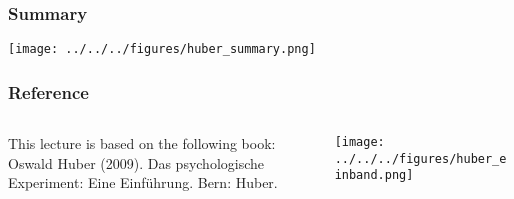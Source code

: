 \documentclass[]{beamer}
\begin{document}
\begin{frame}
\frametitle{Summary}
\texttt{[image: ../../../figures/huber\_summary.png]}
\end{frame}

\begin{frame}
 \frametitle{Reference}
\begin{columns}[T]
 \begin{column}{60mm}
This lecture is based on the following book: \\

Oswald Huber (2009). Das psychologische Experiment: Eine Einf\"uhrung. Bern:
Huber.
 \end{column}
 \begin{column}{40mm}
\texttt{[image: ../../../figures/huber\_einband.png]}
 \end{column}
\end{columns}
\end{frame}
\end{document}
